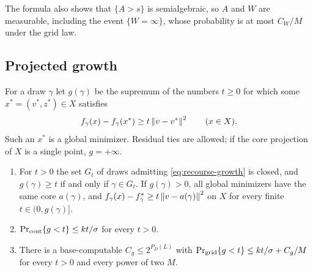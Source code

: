 The formula also shows that $\{A>s\}$ is semialgebraic, so $A$ and $W$
are measurable, including the event $\{W=\infty\}$, whose probability
is at most $C_W/M$ under the grid law.

\subsection{Projected growth}
\label{app:recourse-growth}

For a draw $\gamma$ let $g(\gamma)$ be the supremum of the numbers
$t\ge0$ for which some $x^*=(v^*,z^*)\in X$ satisfies
\begin{equation}
 f_\gamma(x)-f_\gamma(x^*)\ge t\left\lVert v-v^*\right\rVert^2\qquad(x\in X).
 \label{eq:recourse-growth}
\end{equation}
Such an $x^*$ is a global minimizer. Residual ties are allowed; if the
core projection of $X$ is a single point, $g=+\infty$.

\begin{lemma}
\label{lem:recourse-growth}
\begin{enumerate}[label=(\alph*)]
\item For $t>0$ the set $G_t$ of draws admitting \eqref{eq:recourse-growth}
is closed, and $g(\gamma)\ge t$ if and only if $\gamma\in G_t$. If
$g(\gamma)>0$, all global minimizers have the same core $a(\gamma)$, and
$f_\gamma(x)-f_\gamma^*\ge t\left\lVert v-a(\gamma)\right\rVert^2$ on $X$ for every
finite $t\in(0,g(\gamma)]$.
\item $\Pr_{\rm cont}\{g<t\}\le kt/\sigma$ for every $t>0$.
\item There is a base-computable $C_g\le2^{P_D(L)}$ with
$\Pr_{\rm grid}\{g<t\}\le kt/\sigma+C_g/M$ for every $t>0$ and every
power of two $M$.
\end{enumerate}
\end{lemma}

